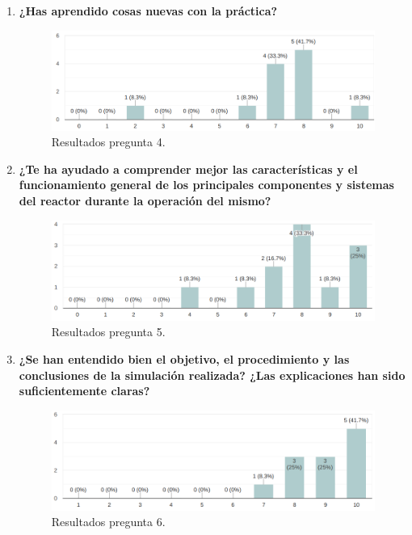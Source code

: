 \begin{enumerate}
    \newpage
    \item \textbf{¿Has aprendido cosas nuevas con la práctica?}
    \newline
    \begin{figure}[h]
        \centering
        \vspace{-0.5cm}
        \includegraphics[width=\textwidth]{content/figures/encuesta_4.png}
        \caption{Resultados pregunta 4.}
        \label{fig:encuesta_4}
    \end{figure}
    
    \item \textbf{¿Te ha ayudado a comprender mejor las características y el funcionamiento general de los principales componentes y sistemas del reactor durante la operación del mismo?}
    
    \begin{figure}[h]
        \centering
        \includegraphics[width=\textwidth]{content/figures/encuesta_5.png}
        \caption{Resultados pregunta 5.}
        \label{fig:encuesta_5}
    \end{figure}
    
    \item \textbf{¿Se han entendido bien el objetivo, el procedimiento y las conclusiones de la simulación realizada? ¿Las explicaciones han sido suficientemente claras?}
    
    \begin{figure}[!h]
        \centering
        \includegraphics[width=\textwidth]{content/figures/encuesta_6.png}
        \caption{Resultados pregunta 6.}
        \label{fig:encuesta_6}
    \end{figure}
    

\end{enumerate}
